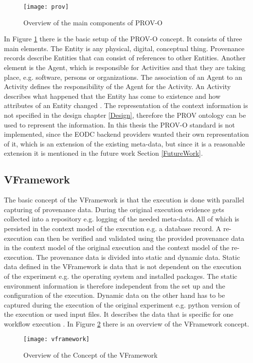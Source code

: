 \documentclass[draft,final]{vutinfth} %
\begin{document}
\begin{figure}[h]
	\centering
	\texttt{[image: prov]}
	\caption{Overview of the main components of PROV-O \cite{733f89c65e4844f9aabcae1c276a5602}}
	\label{fig:prov} %
\end{figure}

In Figure \ref{fig:prov} there is the basic setup of the PROV-O concept. It consists of three main elements. The Entity is any physical, digital, conceptual thing. Provenance records describe Entities that can consist of references to other Entities. Another element is the Agent, which is responsible for Activities and that they are taking place, e.g. software, persons or organizations. The association of an Agent to an Activity defines the responsibility of the Agent for the Activity. An Activity describes what happened that the Entity has come to existence and how attributes of an Entity changed \cite{733f89c65e4844f9aabcae1c276a5602}. The representation of the context information is not specified in the design chapter \ref{Design}, therefore the PROV ontology can be used to represent the information. In this thesis the PROV-O standard is not implemented, since the EODC backend providers wanted their own representation of it, which is an extension of the existing meta-data, but since it is a reasonable extension it is mentioned in the future work Section \ref{FutureWork}.

\subsection{VFramework}\label{vframework}

The basic concept of the VFramework is that the execution is done with parallel capturing of provenance data. During the original execution evidence gets collected into a repository e.g. logging of the needed meta-data. All of which is persisted in the context model of the execution e.g. a database record. A re-execution can then be verified and validated using the provided provenance data in the context model of the original execution and the context model of the re-execution. The provenance data is divided into static and dynamic data. Static data defined in the VFramework is data that is not dependent on the execution of the experiment e.g. the operating system and installed packages. The static environment information is therefore independent from the set up and the configuration of the execution. Dynamic data on the other hand has to be captured during the execution of the original experiment e.g. python version of the execution or used input files. It describes the data that is specific for one workflow execution \cite{Miksa2013FrameworkFV}. 
In Figure \ref{fig:vframework} there is an overview of the VFramework concept.  
\begin{figure}[h]
	\centering
	\texttt{[image: vframework]}
	\caption{Overview of the Concept of the VFramework \cite{Miksa2013FrameworkFV}}
	\label{fig:vframework} %
\end{figure}
\end{document}

